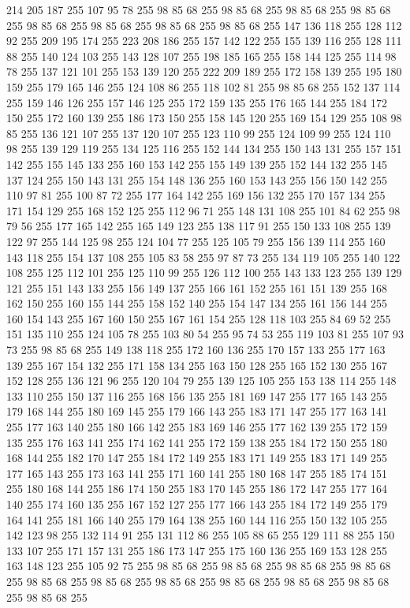 214 205 187 255 107 95 78 255 98 85 68 255 98 85 68 255 98 85 68 255 98 85 68 255 98 85 68 255 98 85 68 255 98 85 68 255 98 85 68 255 147 136 118 255 128 112 92 255 209 195 174 255 223 208 186 255 157 142 122 255 155 139 116 255 128 111 88 255 140 124 103 255 143 128 107 255 198 185 165 255 158 144 125 255 114 98 78 255 137 121 101 255 153 139 120 255 222 209 189 255 172 158 139 255 195 180 159 255 179 165 146 255 124 108 86 255 118 102 81 255 98 85 68 255 152 137 114 255 159 146 126 255 157 146 125 255 172 159 135 255 176 165 144 255 184 172 150 255 172 160 139 255 186 173 150 255 158 145 120 255 169 154 129 255 108 98 85 255 136 121 107 255 137 120 107 255 123 110 99 255 124 109 99 255 124 110 98 255 139 129 119 255 134 125 116 255 152 144 134 255 150 143 131 255 157 151 142 255 155 145 133 255 160 153 142 255 155 149 139 255 152 144 132 255 145 137 124 255 150 143 131 255 154 148 136 255 160 153 143 255 156 150 142 255 110 97 81 255 100 87 72 255 177 164 142 255
169 156 132 255 170 157 134 255 171 154 129 255 168 152 125 255 112 96 71 255 148 131 108 255 101 84 62 255 98 79 56 255 177 165 142 255 165 149 123 255 138 117 91 255 150 133 108 255 139 122 97 255 144 125 98 255 124 104 77 255 125 105 79 255 156 139 114 255 160 143 118 255 154 137 108 255 105 83 58 255 97 87 73 255 134 119 105 255 140 122 108 255 125 112 101 255 125 110 99 255 126 112 100 255 143 133 123 255 139 129 121 255 151 143 133 255 156 149 137 255 166 161 152 255 161 151 139 255 168 162 150 255 160 155 144 255 158 152 140 255 154 147 134 255 161 156 144 255 160 154 143 255 167 160 150 255 167 161 154 255 128 118 103 255 84 69 52 255 151 135 110 255 124 105 78 255 103 80 54 255 95 74 53 255 119 103 81 255 107 93 73 255 98 85 68 255 149 138 118 255 172 160 136 255 170 157 133 255 177 163 139 255 167 154 132 255 171 158 134 255 163 150 128 255 165 152 130 255 167 152 128 255 136 121 96 255 120 104 79 255 139 125 105 255 153 138 114 255 148 133 110 255 150 137 116 255
168 156 135 255 181 169 147 255 177 165 143 255 179 168 144 255 180 169 145 255 179 166 143 255 183 171 147 255 177 163 141 255 177 163 140 255 180 166 142 255 183 169 146 255 177 162 139 255 172 159 135 255 176 163 141 255 174 162 141 255 172 159 138 255 184 172 150 255 180 168 144 255 182 170 147 255 184 172 149 255 183 171 149 255 183 171 149 255 177 165 143 255 173 163 141 255 171 160 141 255 180 168 147 255 185 174 151 255 180 168 144 255 186 174 150 255 183 170 145 255 186 172 147 255 177 164 140 255 174 160 135 255 167 152 127 255 177 166 143 255 184 172 149 255 179 164 141 255 181 166 140 255 179 164 138 255 160 144 116 255 150 132 105 255 142 123 98 255 132 114 91 255 131 112 86 255 105 88 65 255 129 111 88 255 150 133 107 255 171 157 131 255 186 173 147 255 175 160 136 255 169 153 128 255 163 148 123 255 105 92 75 255 98 85 68 255 98 85 68 255 98 85 68 255 98 85 68 255 98 85 68 255 98 85 68 255 98 85 68 255 98 85 68 255 98 85 68 255 98 85 68 255 98 85 68 255
